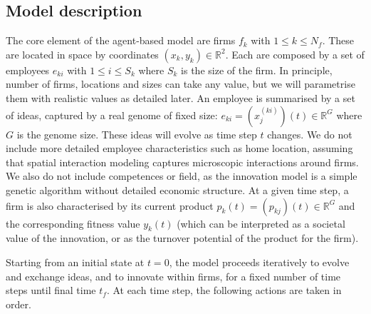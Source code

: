 \documentclass[letterpaper]{article}
\begin{document}
\subsection{Model description}

The core element of the agent-based model are firms $f_k$ with $1 \leq k \leq N_f$. These are located in space by coordinates $(x_k,y_k) \in \mathbb{R}^2$. Each are composed by a set of employees $e_{ki}$ with $1 \leq i \leq S_k$ where $S_k$ is the size of the firm. In principle, number of firms, locations and sizes can take any value, but we will parametrise them with realistic values as detailed later. An employee is summarised by a set of ideas, captured by a real genome of fixed size: $e_{ki} = (x^{(ki)}_j) (t) \in \mathbb{R}^G$ where $G$ is the genome size. These ideas will evolve as time step $t$ changes. We do not include more detailed employee characteristics such as home location, assuming that spatial interaction modeling captures microscopic interactions around firms. We also do not include competences or field, as the innovation model is a simple genetic algorithm without detailed economic structure. At a given time step, a firm is also characterised by its current product $p_k (t) = (p_{kj})(t)\in \mathbb{R}^G$ and the corresponding fitness value $y_k (t)$ (which can be interpreted as a societal value of the innovation, or as the turnover potential of the product for the firm).

Starting from an initial state at $t = 0$, the model proceeds iteratively to evolve and exchange ideas, and to innovate within firms, for a fixed number of time steps until final time $t_f$. At each time step, the following actions are taken in order.
\end{document}
